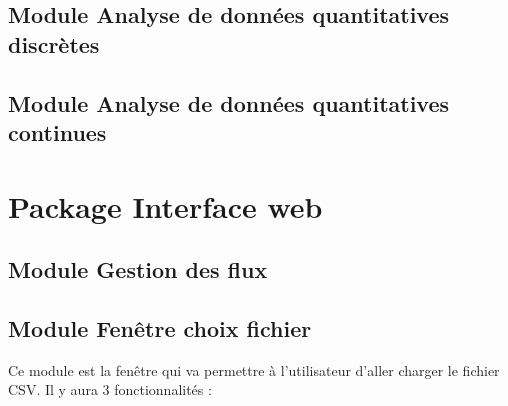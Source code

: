 		\subsection{Module Analyse de données quantitatives discrètes}
			
		\subsection{Module Analyse de données quantitatives continues}
		
		
	\section{Package Interface web}
		
		\subsection{Module Gestion des flux}
		
		\subsection{Module Fenêtre choix fichier}
		Ce module est la fenêtre qui va permettre à l'utilisateur d'aller charger le fichier CSV. Il y aura 3 fonctionnalités :

